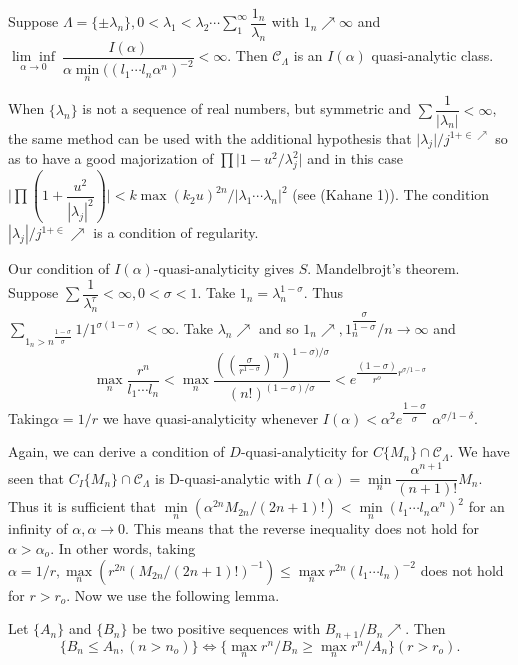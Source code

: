\begin{theorem*}
 Suppose $\Lambda = \{\pm \lambda_n\}, 0 < \lambda_1 < \lambda_2
 \cdots \sum\limits_1^\infty \dfrac{
1_n}{\lambda_n}$ with $1_n
 \nearrow \infty$ and $\underset{\alpha \to 0}{\lim \inf} ~
 \dfrac{I (\alpha)}{\alpha \min\limits_n ((l_1 \cdots l_n
  \alpha^n)^{-2}}< \infty$. Then $\mathscr{C}_\Lambda$ is an $I
 (\alpha) $ quasi-analytic class. 
\end{theorem*}

When $\{\lambda_n\} $ is not a sequence of real numbers, but symmetric
and $\sum \dfrac{1}{| \lambda_n |} < \infty$, the same method can be
used with the additional hypothesis that $\big | \lambda_j \big | /
j^{1+ \in \nearrow}$ so as to have a good majorization of
$\prod \big | 1-u^2 / \lambda^2_j \big |$ and in this case $\big |
\prod (1+ \dfrac{u^2}{| \lambda_j |^2 } )\big | < k \max (k_2 u)^{2n}/
| \lambda_1 \cdots \lambda_n |^2$ (see (Kahane 1)). The condition $|
\lambda_j | / j^{1 + \in } \nearrow$ is a condition of
regularity. 

Our condition of $I (\alpha)$-quasi-analyticity gives
$S$. Mandelbrojt's theorem. Suppose $ \sum \dfrac{1}{\lambda^\tau_n} <
\infty, 0 < \sigma < 1$. Take $1_n = \lambda^{1- \sigma}_n$. Thus
$\sum\limits_{1_n > n^{\dfrac{1-\sigma}{\sigma}}} 1/1^{\sigma (1-
 \sigma)} < \infty$. Take $\lambda_n \nearrow$ and so $1_n \nearrow,
1^{\dfrac{\sigma}{1- \sigma}}_n / n\to \infty$ and 
$$
\max_{n} \frac{r^n}{l_1 \cdots l_n} < \max_{n} \frac{(( 
 \frac{\sigma}{r^{1-\sigma}})^n )^{1-\sigma) / \sigma}}{(n !)^{(1 -
 \sigma)/ \sigma}} < e^{\dfrac{(1-\sigma)}{r^o}r^{\sigma/1 -
 \sigma}} 
$$
Taking\pageoriginale $\alpha = 1/ r$ we have quasi-analyticity whenever $I (\alpha)
< \alpha^2 e^{\dfrac{1- \sigma}{\sigma}}$ $\alpha^{\sigma / 1 - \delta}$. 

Again, we can derive a condition of $D$-quasi-analyticity for $C \{
M_n\} \cap \mathscr{C}_\Lambda$. We have seen that $C_I \{M_n\} \cap
\mathscr{C}_\Lambda$ is D-quasi-analytic with $I (\alpha) =
\min\limits_{n} \dfrac{\alpha^{n+1}}{(n+1) !} M_n$. Thus it is
sufficient that $\min\limits_{n} (\alpha^{2 n} M_{2n}/ (2n+ 1)!) <
\min\limits_{n} (l_1 \cdots l_n \alpha^n)^2$ for an infinity of
$\alpha, \alpha \to 0$. This means that the reverse inequality does
not hold for $\alpha > \alpha_o$. In other words, taking $\alpha =
1/r, \max\limits_n (r^{2n} (M_{2n}/ (2 n + 1) ! )^{-1}) \le
\max\limits_n r^{2 n} (l_1 \cdots l_n)^{-2}$ does not hold for $r >
r_o$. Now we use the following lemma. 

\begin{lemma*}
 Let $\{ A_n\}$ and $\{ B_n \}$ be two positive sequences with
 $B_{n+1}/ B_n \nearrow$. Then 
 $$
 \{B_n \le A_n, (n > n_o ) \} \Longleftrightarrow \{\max_n r^n/ B_n
 \ge \max_n r^n/A_n \} (r > r_o). 
 $$
\end{lemma*}

